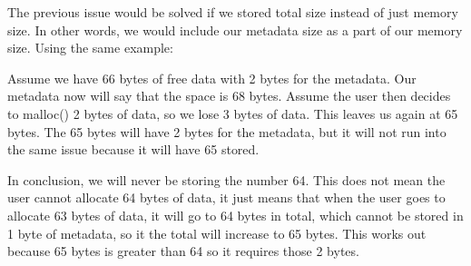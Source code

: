 \documentclass{article}
\begin{document}
    The previous issue would be solved if we stored total size instead of just memory size. In other words, we would include our metadata size as a part of our memory size. Using the same example:
    
    Assume we have 66 bytes of free data with 2 bytes for the metadata. Our metadata now will say that the space is 68 bytes. Assume the user then decides to malloc() 2 bytes of data, so we lose 3 bytes of data. This leaves us again at 65 bytes. The 65 bytes will have 2 bytes for the metadata, but it will not run into the same issue because it will have 65 stored.
    
    In conclusion, we will never be storing the number 64. This does not mean the user cannot allocate 64 bytes of data, it just means that when the user goes to allocate 63 bytes of data, it will go to 64 bytes in total, which cannot be stored in 1 byte of metadata, so it the total will increase to 65 bytes. This works out because 65 bytes is greater than 64 so it requires those 2 bytes.
    
\end{document}
